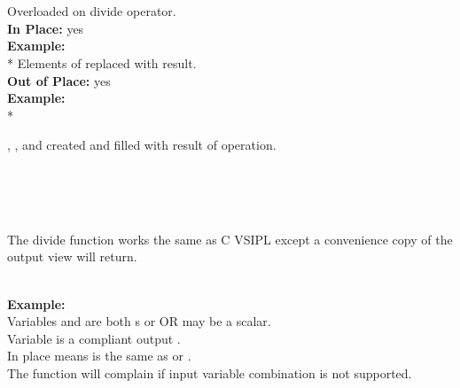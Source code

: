 \\\pyjvsiph
\\\vmthdh
\hspace*{.06\textwidth}Overloaded on divide operator.\\
\hspace*{.06\textwidth}\textbf{In Place: }\hspace{.2cm} yes\\
\hspace*{.08\textwidth}\textbf{Example: }\\*
\hspace*{.1\textwidth}Elements of  replaced with result.\\
\hspace*{.06\textwidth}\textbf{Out of Place: }\hspace{.2cm} yes\\
\hspace*{.08\textwidth}\textbf{Example: }\\*
\hspace*{.1\textwidth}\parbox{.85\textwidth}{, , and   created and filled with result of operation.}\\
\\\\
\hspace*{.06\textwidth}\parbox{.93\textwidth}{The divide function works the same as C VSIPL except a convenience copy of the output view will return.\vspace{.2cm}}\\
\hspace*{.08\textwidth}\textbf{Example: }\\
\hspace*{.1\textwidth}Variables  and  are both s or  OR  may be a scalar.\\
\hspace*{.1\textwidth}Variable  is a compliant output .\\
\hspace*{.1\textwidth}In place means  is the same as  or .\\
\hspace*{.1\textwidth}The function will complain if input variable combination is not supported.\\

